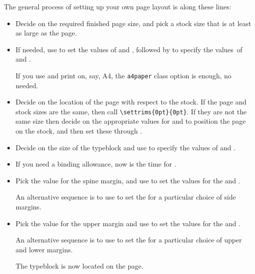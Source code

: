     The general process of setting up your own page layout 
is along these lines:
\begin{itemize}
\item Decide on the required finished page size,
  and pick a stock size that is at least as
  large as the page.
\item If needed, use \cmd{\setstocksize}
  to set the values of \lnc{\stockheight} and \lnc{\stockwidth},
  followed by \cmd{\settrimmedsize} to specify the values\ of
  \lnc{\paperheight} and \lnc{\paperwidth}.
  
  If you use and print on, say, A4, the \texttt{a4paper} class option
  is enough, no \cmd{\setstocksize} needed.
\item Decide on the location of the page with
  respect to the stock. If the page and
  stock sizes are the same, then call
  \verb?\settrims{0pt}{0pt}?.  If they are not the same size then
  decide on the appropriate values for \lnc{\trimtop} and
  \lnc{\trimedge} to position the page on the stock, and
  then set these through \cmd{\settrims}.
\item Decide on the size of the typeblock
  and use \cmd{\settypeblocksize} to
  specify the values of \lnc{\textheight} and \lnc{\textwidth}.
\item If you need a binding allowance, now is
  the time for \cmd{\setbinding}.
\item Pick the value for the spine margin, and use
  \cmd{\setlrmargins} to set the values
  for the \lnc{\spinemargin} and \lnc{\foremargin}.

  An alternative sequence is to use \cmd{\setlrmarginsandblock} to set
  the \lnc{\textwidth} for a particular choice of side
  margins.

\item Pick the value for the upper margin and use
  \cmd{\setulmargins} to set the values
  for the \lnc{\uppermargin} and \cmd{\lowermargin}.

  An alternative sequence is to use \cmd{\setulmarginsandblock} to set
  the \lnc{\textheight} for a particular choice of upper and lower
  margins.

  The typeblock is now located on the page.


\end{itemize}
